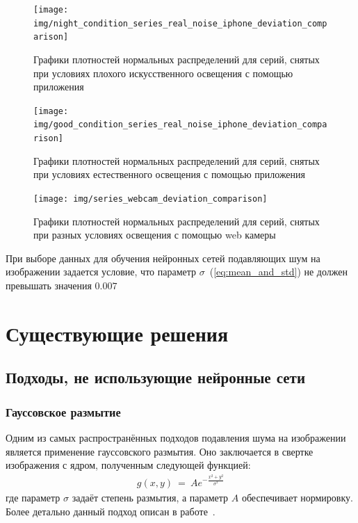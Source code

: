 \begin{figure}[H]
	\centering
	\texttt{[image: img/night\_condition\_series\_real\_noise\_iphone\_deviation\_comparison]}
	\caption{Графики плотностей нормальных распределений для серий, снятых при условиях плохого искусственного освещения с помощью приложения~\autocite{RAWCamera}}
	\label{fig:distribuion_real_noise}
\end{figure}


\begin{figure}[H]
	\centering
	\texttt{[image: img/good\_condition\_series\_real\_noise\_iphone\_deviation\_comparison]}
	\caption{Графики плотностей нормальных распределений для серий, снятых при условиях естественного освещения с помощью приложения~\autocite{RAWCamera}}
	\label{fig:distribuion_real_noise_good_condition}
\end{figure}

\begin{figure}[H]
	\centering
	\texttt{[image: img/series\_webcam\_deviation\_comparison]}
	\caption{Графики плотностей нормальных распределений для серий, снятых при разных условиях освещения с помощью web камеры~\autocite{WebCam}}
	\label{fig:distribuion_webcam}
\end{figure}


При выборе данных для обучения нейронных сетей подавляющих шум на изображении задается условие, что параметр $\sigma$~(\ref{eq:mean_and_std}) не должен превышать значения $0.007$

\section{Существующие решения}
\subsection{Подходы, не использующие нейронные сети}

\subsubsection{Гауссовское размытие}
Одним из самых распространённых подходов подавления шума на изображении является применение гауссовского размытия. Оно заключается в свертке изображения с ядром, полученным следующей функцией:
\begin{eqnarray}\label{eq:gauss_kernel_function}
g(x, y)\ =\ A e^{-\frac{x^2 + y^2}{\sigma^2}}
\end{eqnarray}
где параметр $\sigma$ задаёт степень размытия, а параметр $A$ обеспечивает нормировку. Более детально данный подход описан в работе~\autocite{GaussianBilinear}.

